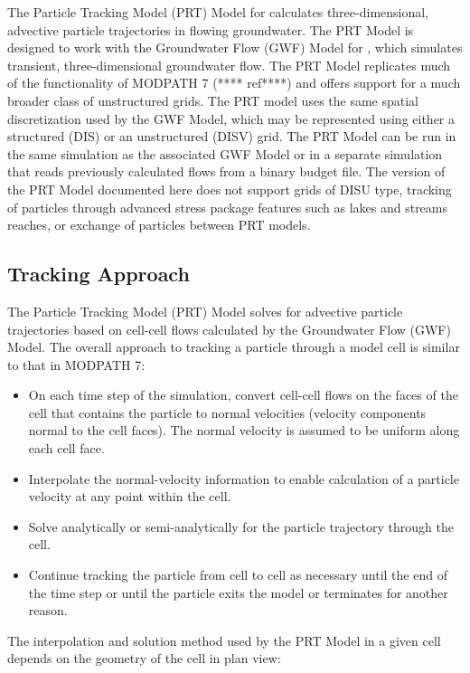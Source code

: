 
The Particle Tracking Model (PRT) Model for \mf calculates three-dimensional, advective particle trajectories in flowing groundwater. The PRT Model is designed to work with the Groundwater Flow (GWF) Model \citep{modflow6gwf} for \mf, which simulates transient, three-dimensional groundwater flow. The PRT Model replicates much of the functionality of MODPATH 7 {\color{red} (**** ref****)} and offers support for a much broader class of unstructured grids. The PRT model uses the same spatial discretization used by the GWF Model, which may be represented using either a structured (DIS) or an unstructured (DISV) grid. The PRT Model can be run in the same simulation as the associated GWF Model or in a separate simulation that reads previously calculated flows from a binary budget file. The version of the PRT Model documented here does not support grids of DISU type, tracking of particles through advanced stress package features such as lakes and streams reaches, or exchange of particles between PRT models.

\subsection{Tracking Approach} \label{sec:trackingapproach}

The Particle Tracking Model (PRT) Model solves for advective particle trajectories based on cell-cell flows calculated by the Groundwater Flow (GWF) Model. The overall approach to tracking a particle through a model cell is similar to that in MODPATH 7:

\begin{itemize}
\item On each time step of the simulation, convert cell-cell flows on the faces of the cell that contains the particle to normal velocities (velocity components normal to the cell faces). The normal velocity is assumed to be uniform along each cell face.
\item Interpolate the normal-velocity information to enable calculation of a particle velocity at any point within the cell.
\item Solve analytically or semi-analytically for the particle trajectory through the cell.
\item Continue tracking the particle from cell to cell as necessary until the end of the time step or until the particle exits the model or terminates for another reason.
\end{itemize}

\noindent The interpolation and solution method used by the PRT Model in a given cell depends on the geometry of the cell in plan view:

